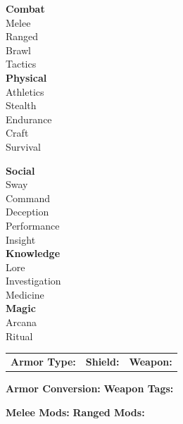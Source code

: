 \begin{tcolorbox}[
    enhanced, sharp corners, 
    colback=white, colframe=black!50, 
    title={\large\bfseries Skills (0--5)}, 
    fonttitle=\bfseries,
    breakable
]
\begin{minipage}[t]{0.47\textwidth}
\small
\textbf{Combat} \\
Melee \hrulefill\\
Ranged \hrulefill\\
Brawl \hrulefill\\
Tactics \hrulefill\\
\vspace{4pt}
\textbf{Physical} \\
Athletics \hrulefill\\
Stealth \hrulefill\\
Endurance \hrulefill\\
Craft \hrulefill\\
Survival \hrulefill\\
\end{minipage}
\hfill
\begin{minipage}[t]{0.47\textwidth}
\small
\textbf{Social} \\
Sway \hrulefill\\
Command \hrulefill\\
Deception \hrulefill\\
Performance \hrulefill\\
Insight \hrulefill\\
\vspace{4pt}
\textbf{Knowledge} \\
Lore \hrulefill\\
Investigation \hrulefill\\
Medicine \hrulefill\\
\vspace{4pt}
\textbf{Magic} \\
Arcana \hrulefill\\
Ritual \hrulefill\\
\end{minipage}
\end{tcolorbox}

\begin{tcolorbox}[
    enhanced, sharp corners, 
    colback=white, colframe=black!50, 
    title={\large\bfseries Combat \& Protection}, 
    fonttitle=\bfseries,
    breakable
]
\begin{tabular}{p{}p{}p{}}
\textbf{Armor Type:} \hrulefill & \textbf{Shield:} \hrulefill & \textbf{Weapon:} \hrulefill \\
\end{tabular}
\vspace{4pt}
\textbf{Armor Conversion:} \hrulefill \quad \textbf{Weapon Tags:} \hrulefill
\vspace{4pt}

\textbf{Melee Mods:} \hrulefill \quad \textbf{Ranged Mods:} \hrulefill
\end{tcolorbox}

